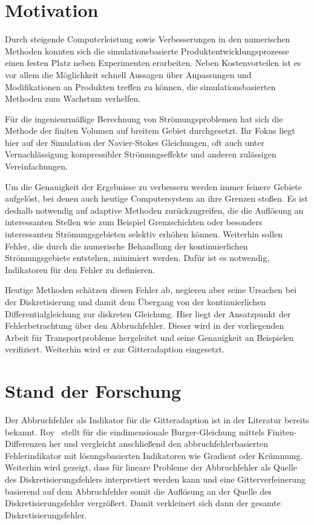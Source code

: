 \section{Motivation}
Durch steigende Computerleistung sowie Verbesserungen in den numerischen Methoden konnten
sich die simulationsbasierte Produktentwicklungsprozesse einen festen Platz neben
Experimenten erarbeiten. Neben Kostenvorteilen ist es vor allem die Möglichkeit
schnell Aussagen über Anpassungen und Modifikationen an Produkten treffen zu können, die
simulationsbasierten Methoden zum Wachstum verhelfen.

Für die ingenieurmäßige Berechnung von Strömungsproblemen hat sich die Methode der
finiten Volumen auf breitem Gebiet durchgesetzt. Ihr Fokus liegt hier auf der Simulation
der Navier-Stokes Gleichungen, oft auch unter Vernachlässigung kompressibler Strömungseffekte und
anderen zulässigen Vereinfachungen.

Um die Genauigkeit der Ergebnisse zu verbessern werden immer feinere Gebiete aufgelöst,
bei denen auch heutige Computersystem an ihre Grenzen stoßen. Es ist deshalb notwendig
auf adaptive Methoden zurückzugreifen, die die Auflösung an interessanten Stellen wie
zum Beispiel Grenzschichten oder besonders interessanten Strömungsgebieten selektiv erhöhen können.
Weiterhin sollen Fehler, die durch die numerische Behandlung der kontinuierlichen Strömungsgebiete
entstehen, minimiert werden. Dafür ist es notwendig, Indikatoren für den Fehler zu definieren.

Heutige Methoden schätzen diesen Fehler ab, negieren aber seine Ursachen bei der Diskretisierung
und damit dem Übergang von der kontinuierlichen Differentialgleichung zur diskreten Gleichung.
Hier liegt der Ansatzpunkt der Fehlerbetrachtung über den Abbruchfehler. Dieser wird in der
vorliegenden Arbeit für Transportprobleme hergeleitet und seine Genauigkeit an Beispielen
verifiziert. Weiterhin wird er zur Gitteradaption eingesetzt.


\section{Stand der Forschung}

Der Abbruchfehler als Indikator für die Gitteradaption ist in der Literatur bereits bekannt.
Roy~\cite{roy2} stellt für die eindimensionale Burger-Gleichung mittels
Finiten-Differenzen her und vergleicht anschließend den abbruchfehlerbasierten Fehlerindikator
mit lösungsbasierten Indikatoren wie Gradient oder Krümmung. Weiterhin wird gezeigt,
dass für lineare Probleme der Abbruchfehler
als Quelle des Diskretisierungsfehlers interpretiert werden kann und
eine Gitterverfeinerung basierend auf dem Abbruchfehler
somit die Auflösung an der Quelle des Diskretisierungsfehler vergrößert.
Damit verkleinert sich dann der gesamte Diskretisierungsfehler.

